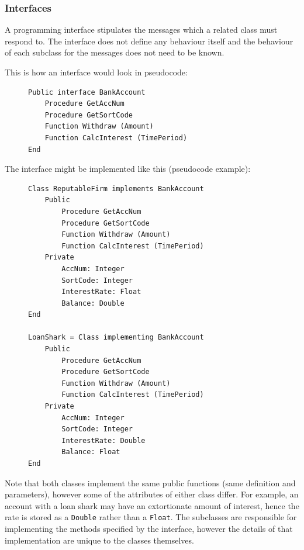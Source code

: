 \documentclass[9pt]{article}
\begin{document}
\subsubsection{Interfaces}
\label{sec:org1baddf1}

A programming interface stipulates the messages which a related class must respond to. The interface does not define any behaviour itself and the behaviour of each subclass for the messages does not need to be known.

This is how an interface would look in pseudocode:

\begin{figure}[H]
\begin{verbatim}
Public interface BankAccount
    Procedure GetAccNum
    Procedure GetSortCode
    Function Withdraw (Amount)
    Function CalcInterest (TimePeriod)
End
\end{verbatim}
\end{figure}

The interface might be implemented like this (pseudocode example):

\begin{figure}[H]
\begin{verbatim}
Class ReputableFirm implements BankAccount
    Public
        Procedure GetAccNum
        Procedure GetSortCode
        Function Withdraw (Amount)
        Function CalcInterest (TimePeriod)
    Private
        AccNum: Integer
        SortCode: Integer
        InterestRate: Float
        Balance: Double
End

LoanShark = Class implementing BankAccount
    Public
        Procedure GetAccNum
        Procedure GetSortCode
        Function Withdraw (Amount)
        Function CalcInterest (TimePeriod)
    Private
        AccNum: Integer
        SortCode: Integer
        InterestRate: Double
        Balance: Float
End
\end{verbatim}
\end{figure}

Note that both classes implement the same public functions (same definition and parameters), however some of the attributes of either class differ. For example, an account with a loan shark may have an extortionate amount of interest, hence the rate is stored as a \texttt{Double} rather than a \texttt{Float}. The subclasses are responsible for implementing the methods specified by the interface, however the details of that implementation are unique to the classes themselves.
\end{document}
